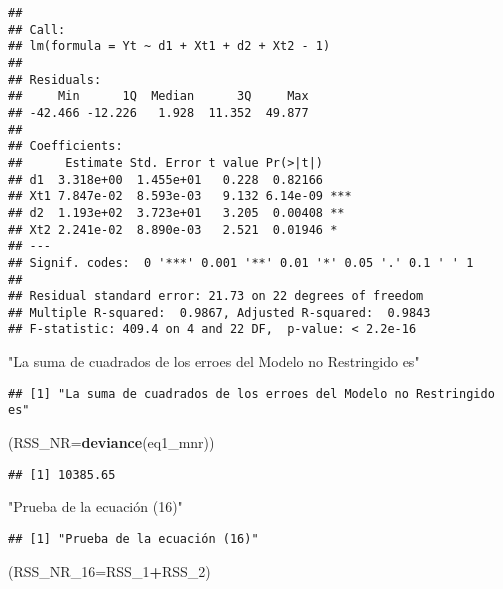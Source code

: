 \documentclass[
]{article}
\newenvironment{Shaded}{\begin{snugshade}}{\end{snugshade}}
\newcommand{\DataTypeTok}[1]{\textcolor[rgb]{0.13,0.29,0.53}{#1}}
\newcommand{\DecValTok}[1]{\textcolor[rgb]{0.00,0.00,0.81}{#1}}
\newcommand{\KeywordTok}[1]{\textcolor[rgb]{0.13,0.29,0.53}{\textbf{#1}}}
\newcommand{\NormalTok}[1]{#1}
\newcommand{\OperatorTok}[1]{\textcolor[rgb]{0.81,0.36,0.00}{\textbf{#1}}}
\newcommand{\StringTok}[1]{\textcolor[rgb]{0.31,0.60,0.02}{#1}}
\begin{document}
\begin{verbatim}
## 
## Call:
## lm(formula = Yt ~ d1 + Xt1 + d2 + Xt2 - 1)
## 
## Residuals:
##     Min      1Q  Median      3Q     Max 
## -42.466 -12.226   1.928  11.352  49.877 
## 
## Coefficients:
##      Estimate Std. Error t value Pr(>|t|)    
## d1  3.318e+00  1.455e+01   0.228  0.82166    
## Xt1 7.847e-02  8.593e-03   9.132 6.14e-09 ***
## d2  1.193e+02  3.723e+01   3.205  0.00408 ** 
## Xt2 2.241e-02  8.890e-03   2.521  0.01946 *  
## ---
## Signif. codes:  0 '***' 0.001 '**' 0.01 '*' 0.05 '.' 0.1 ' ' 1
## 
## Residual standard error: 21.73 on 22 degrees of freedom
## Multiple R-squared:  0.9867, Adjusted R-squared:  0.9843 
## F-statistic: 409.4 on 4 and 22 DF,  p-value: < 2.2e-16
\end{verbatim}

\begin{Shaded}
\begin{Highlighting}[]
\StringTok{"La suma de cuadrados de los erroes del Modelo no Restringido es"}
\end{Highlighting}
\end{Shaded}

\begin{verbatim}
## [1] "La suma de cuadrados de los erroes del Modelo no Restringido es"
\end{verbatim}

\begin{Shaded}
\begin{Highlighting}[]
\NormalTok{(}\DataTypeTok{RSS_NR=}\KeywordTok{deviance}\NormalTok{(eq1_mnr))}
\end{Highlighting}
\end{Shaded}

\begin{verbatim}
## [1] 10385.65
\end{verbatim}

\begin{Shaded}
\begin{Highlighting}[]
\StringTok{"Prueba de la ecuación (16)"}
\end{Highlighting}
\end{Shaded}

\begin{verbatim}
## [1] "Prueba de la ecuación (16)"
\end{verbatim}

\begin{Shaded}
\begin{Highlighting}[]
\NormalTok{(}\DataTypeTok{RSS_NR_16=}\NormalTok{RSS_}\DecValTok{1}\OperatorTok{+}\NormalTok{RSS_}\DecValTok{2}\NormalTok{)}
\end{Highlighting}
\end{Shaded}
\end{document}
